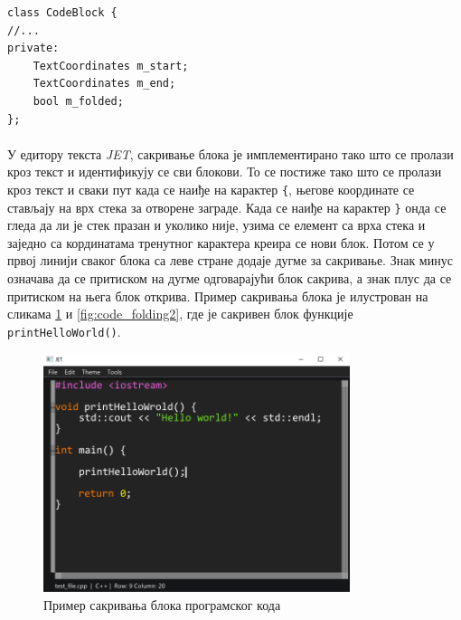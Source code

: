 \documentclass[12pt,oneside]{memoir}
\begin{document}
\begin{verbatim}
class CodeBlock {
//...
private:
	TextCoordinates m_start;
	TextCoordinates m_end;
	bool m_folded;
};
\end{verbatim}

\paragraph{}
У едитору текста \textit{JET}, сакривање блока је имплементирано тако 
што се пролази кроз текст и идентификују се сви блокови. То се постиже тако
што се пролази кроз текст и сваки пут када се наиђе на карактер \verb|{|, његове
координате се стављају на врх стека за отворене заграде. Када се наиђе на карактер
\verb|}| онда се гледа да ли је стек празан и уколико није, узима се елемент са
врха стека и заједно са кординатама тренутног карактера креира се нови блок. Потом се у првој
линији сваког блока са леве стране додаје дугме за сакривање. Знак минус
означава да се притиском на дугме одговарајући блок сакрива, а знак плус да се притиском на њега блок открива. Пример сакривања блока је илустрован
на сликама \ref{fig:code_folding1} и \ref{fig:code_folding2}, где је сакривен блок функције \verb|printHelloWorld()|.

\begin{figure}[!ht]
	\centering
	\includegraphics[width=0.8\textwidth]{images/code_folding_1.png}
	\caption{Пример сакривања блока програмског кода}
	\label{fig:code_folding1}
\end{figure} 
\end{document}
